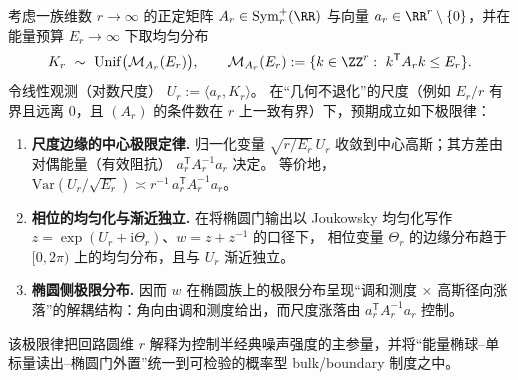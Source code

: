 
\begin{conjecture}\label{conj:graph-energy-high-cdim-elliptic-observation}
考虑一族维数 \(r\to\infty\) 的正定矩阵 \(A_r\in\mathrm{Sym}_r^+(\RR)\) 与向量 \(a_r\in\RR^r\setminus\{0\}\)，并在能量预算 \(E_r\to\infty\) 下取均匀分布
\[
K_r\ \sim\ \mathrm{Unif}\bigl(\mathcal M_{A_r}(E_r)\bigr),
\qquad
\mathcal M_{A_r}(E_r):=\{k\in\ZZ^r:\ k^{\mathsf T}A_r k\le E_r\}.
\]
令线性观测（对数尺度）
\(
U_r:=\langle a_r,K_r\rangle
\)。
在“几何不退化”的尺度（例如 \(E_r/r\) 有界且远离 \(0\)，且 \((A_r)\) 的条件数在 \(r\) 上一致有界）下，预期成立如下极限律：
\begin{enumerate}
  \item \textbf{尺度边缘的中心极限定律.}
        归一化变量 \(\sqrt{r/E_r}\,U_r\) 收敛到中心高斯；其方差由对偶能量（有效阻抗）
        \(
        a_r^{\mathsf T}A_r^{-1}a_r
        \)
        决定。
        等价地，
        \(
        \mathrm{Var}(U_r/\sqrt{E_r})\asymp r^{-1}\,a_r^{\mathsf T}A_r^{-1}a_r
        \)。
  \item \textbf{相位的均匀化与渐近独立.}
        在将椭圆门输出以 Joukowsky 均匀化写作 \(z=\exp(U_r+\mathrm{i}\Theta_r)\)、\(w=z+z^{-1}\) 的口径下，
        相位变量 \(\Theta_r\) 的边缘分布趋于 \([0,2\pi)\) 上的均匀分布，且与 \(U_r\) 渐近独立。
  \item \textbf{椭圆侧极限分布.}
        因而 \(w\) 在椭圆族上的极限分布呈现“调和测度 \(\times\) 高斯径向涨落”的解耦结构：角向由调和测度给出，而尺度涨落由 \(a_r^{\mathsf T}A_r^{-1}a_r\) 控制。
\end{enumerate}
该极限律把回路圆维 \(r\) 解释为控制半经典噪声强度的主参量，并将“能量椭球--单标量读出--椭圆门外置”统一到可检验的概率型 bulk/boundary 制度之中。
\end{conjecture}

\endinput
